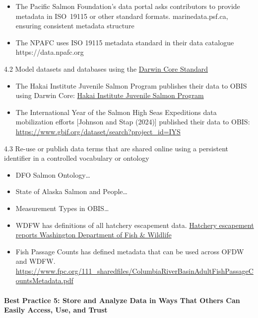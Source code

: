 \documentclass[
  letterpaper,
  DIV=11,
  numbers=noendperiod]{scrartcl}
\makeatletter
\let\oldparagraph\paragraph
\renewcommand{\paragraph}{
    \@ifstar
      \xxxParagraphStar
      \xxxParagraphNoStar
  }
\newcommand{\xxxParagraphStar}[1]{\oldparagraph*{#1}\mbox{}}
\newcommand{\xxxParagraphNoStar}[1]{\oldparagraph{#1}\mbox{}}
\providecommand{\tightlist}{%
  \setlength{\itemsep}{0pt}\setlength{\parskip}{0pt}}\usepackage{longtable,booktabs,array}
\makeatother
\begin{document}
\begin{itemize}
\tightlist
\item
  The Pacific Salmon Foundation's data portal asks contributors to
  provide metadata in ISO~19115 or other standard formats.
  marinedata.psf.ca, ensuring consistent metadata structure
\item
  The NPAFC uses ISO 19115 metadata standard in their data catalogue
  https://data.npafc.org
\end{itemize}

4.2 Model datasets and databases using the
\href{https://dwc.tdwg.org/}{Darwin Core Standard}

\begin{itemize}
\item
  The Hakai Institute Juvenile Salmon Program publishes their data to
  OBIS using Darwin Core:
  \href{https://www.gbif.org/dataset/72de3af4-1572-4f2d-8006-2bfa2007065c}{Hakai
  Institute Juvenile Salmon Program}
\item
  The International Year of the Salmon High Seas Expeditions data
  mobilization efforts {[}Johnson and Stap (2024){]} published their
  data to OBIS: \url{https://www.gbif.org/dataset/search?project_id=IYS}
\end{itemize}

4.3 Re-use or publish data terms that are shared online using a
persistent identifier in a controlled vocabulary or ontology

\begin{itemize}
\item
  DFO Salmon Ontology\ldots{}
\item
  State of Alaska Salmon and People\ldots{}
\item
  Measurement Types in OBIS\ldots{}
\item
  WDFW has definitions of all hatchery escapement data.
  \href{https://wdfw.wa.gov/fishing/management/hatcheries/escapement\#definitions}{Hatchery
  escapement reports \textbar{} Washington Department of Fish \&
  Wildlife}
\item
  Fish Passage Counts has defined metadata that can be used across OFDW
  and WDFW.
  \url{https://www.fpc.org/111_sharedfiles/ColumbiaRiverBasinAdultFishPassageCountsMetadata.pdf}
\end{itemize}

\paragraph{\texorpdfstring{\textbf{Best Practice 5: Store and Analyze
Data in Ways That Others Can Easily Access, Use, and
Trust}}{Best Practice 5: Store and Analyze Data in Ways That Others Can Easily Access, Use, and Trust}}\label{best-practice-5-store-and-analyze-data-in-ways-that-others-can-easily-access-use-and-trust}
\end{document}
